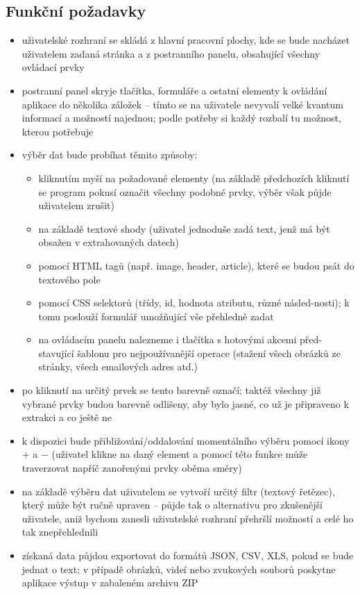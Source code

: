 \documentclass[thesis=B,czech]{FITthesis}[2012/06/26]
\begin{document}
\subsection{Funkční požadavky}
\begin{itemize}
	\item uživatelské rozhraní se skládá z hlavní pracovní plochy, kde se bude nacházet uživatelem zadaná stránka a z postranního panelu, obsahující všechny ovládací prvky
	\item postranní panel skryje tlačítka, formuláře a ostatní elementy k ovládání aplikace do několika záložek -- tímto se na uživatele nevyvalí velké kvantum informací a možností najednou; podle potřeby si každý rozbalí tu možnost, kterou potřebuje
	\item výběr dat bude probíhat těmito způsoby:
	\begin{itemize}
		\item kliknutím myší na požadované elementy (na základě předchozích kliknutí se program pokusí označit všechny podobné prvky, výběr však půjde uživatelem zrušit)
		\item na základě textové shody (uživatel jednoduše zadá text, jenž má být obsažen v extrahovaných datech)
		\item pomocí HTML tagů (např. image, header, article), které se budou psát do textového pole
		\item pomocí CSS selektorů (třídy, id, hodnota atributu, různé násled-nosti); k tomu poslouží formulář umožňující vše přehledně zadat
		\item na ovládacím panelu nalezneme i tlačítka s hotovými akcemi před-stavující šablonu pro nejpoužívanější operace (stažení všech obrázků ze stránky, všech emailových adres atd.)
	\end{itemize}
	\item po kliknutí na určitý prvek se tento barevně označí; taktéž všechny již vybrané prvky budou barevně odlišeny, aby bylo jasné, co už je připraveno k extrakci a co ještě ne
	\item k dispozici bude přibližování/oddalování momentálního výběru pomocí ikony $+$ a $-$ (uživatel klikne na daný element a pomocí této funkce může traverzovat napříč zanořenými prvky oběma směry)
	\item na základě výběru dat uživatelem se vytvoří určitý filtr (textový řetězec), který může být ručně upraven -- půjde tak o alternativu pro zkušenější uživatele, aniž bychom zanesli uživatelské rozhraní přehršlí možností a celé ho tak znepřehlednili
	\item získaná data půjdou exportovat do formátů JSON, CSV, XLS, pokud se bude jednat o text; v případě obrázků, videí nebo zvukových souborů poskytne aplikace výstup v zabaleném archivu ZIP
\end{itemize}
\end{document}
